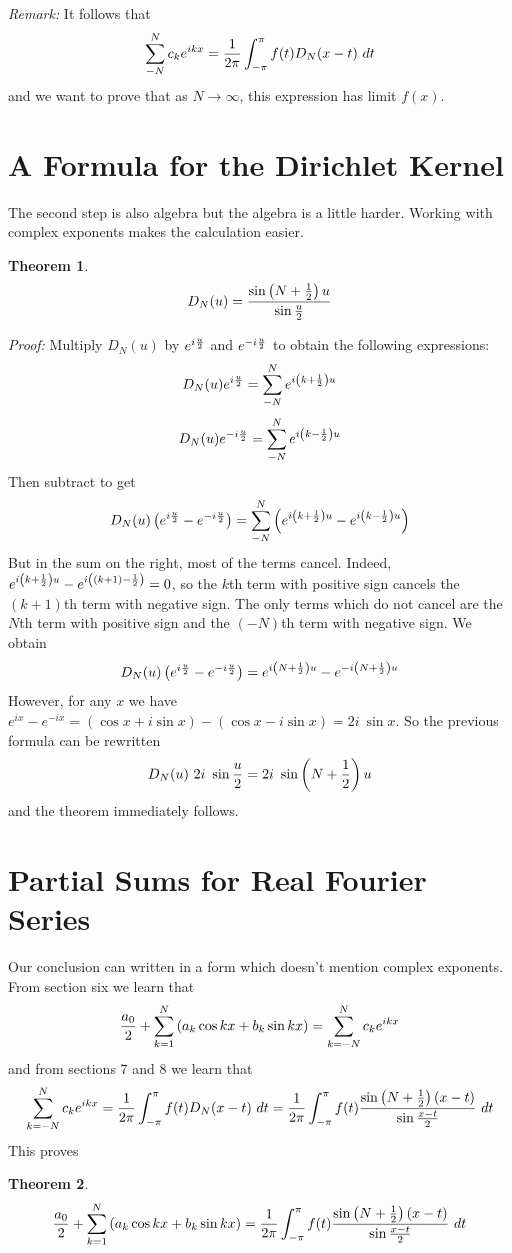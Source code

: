 \documentclass[11pt, oneside]{amsart}
\newtheorem{theorem}{Theorem}
\begin{document}
{\em Remark:} It follows that 
$$\sum_{-N}^N c_k e^{ikx} = {1 \over {2 \pi}} \int_{- \pi}^\pi f(t) D_N(x - t) \ dt$$
and we want to prove that as $N \rightarrow \infty$, this expression has limit $f(x)$.

\section{A Formula for the Dirichlet Kernel}

The second step is also algebra but the algebra is a little harder. Working with complex exponents makes the calculation easier.
\begin{theorem}
$$D_N(u) = {{\sin \left(N + {1 \over 2} \right)u } \over {\sin {u \over 2}}}$$
\end{theorem}
{\em Proof:} %
Multiply $D_N(u)$ by $e^{i {u \over 2}}$ and $e^{-i {u \over 2}}$ to obtain the following expressions:
\newpage
$$D_N(u) e^{i {u \over 2}} = \sum_{-N}^N e^{i \left(k + {1 \over 2}\right)u}$$
$$D_N(u) e^{- i {u \over 2}} = \sum_{-N}^N e^{i \left(k - {1 \over 2}\right)u}$$
Then subtract to get
$$D_N(u) \left(e^{i {u \over 2}} - e^{- i {u \over 2}} \right) = \sum_{-N}^N\left( e^{i \left(k + {1 \over 2}\right)u} - e^{i \left(k - {1 \over 2}\right)u} \right) $$
But in the sum on the right, most of the terms cancel. Indeed, $e^{i \left(k + {1 \over 2}\right)u} - e^{i \left( (k + 1) - {1 \over 2} \right)} = 0$, so the $k$th term with positive sign cancels the $(k + 1)$th term with negative sign.
The only terms which do not cancel are the $N$th term with positive sign and the $(-N)$th term with negative sign. We obtain
$$D_N(u) \left(e^{i {u \over 2}} - e^{- i {u \over 2}} \right) = e^{i \left( N + {1 \over 2} \right)u} - e^{- i \left( N + {1 \over 2} \right) u}$$
However, for any $x$ we have $e^{ix} - e^{-ix} = \left( \cos x + i \sin x \right) - \left( \cos x - i \sin x \right) = 2 i \ \sin x.$ So the previous formula can be rewritten
$$D_N(u) \ 2i \ \sin {u \over 2} = 2 i \ \sin \left(N + {1 \over 2} \right) u$$
and the theorem immediately follows.

\section{Partial Sums for Real Fourier Series}

Our conclusion can written in a form which doesn't mention complex exponents. From section six we learn that
$${{a_0} \over 2} + \sum_{k = 1}^N \left( a_k \cos kx + b_k \sin kx \right) = \sum_{k = -N}^N c_k e^{ikx}$$
and from sections 7 and 8 we learn that
$$\sum_{k = -N}^N c_k e^{ikx} = {1 \over {2 \pi}} \int_{- \pi}^\pi f(t) D_N(x - t) \ dt =  {1 \over {2 \pi}} \int_{- \pi}^\pi f(t) {{\sin \left(N + {1 \over 2}\right)(x - t)} \over {\sin {{x - t} \over 2}}} \ dt $$
This proves 
\begin{theorem}
$${{a_0} \over 2} + \sum_{k = 1}^N \left( a_k \cos kx + b_k \sin kx \right) =  {1 \over {2 \pi}} \int_{- \pi}^\pi f(t) {{\sin \left(N + {1 \over 2}\right)(x - t)} \over {\sin {{x - t} \over 2}}} \ dt $$
\end{theorem}
\end{document}
